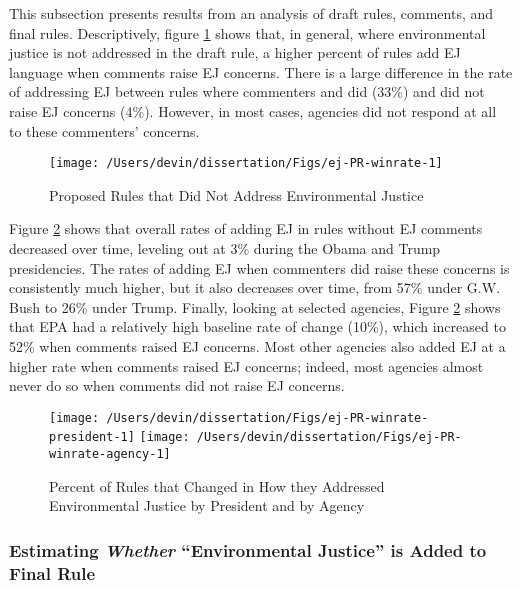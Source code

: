 \documentclass[
      12pt,
        ]{article}
\begin{document}
This subsection presents results from an analysis of draft
rules, comments, and final rules. Descriptively, figure
\ref{fig:ej-PR-winrate-1}
shows that, in general, where environmental
justice is not addressed in the draft rule, a higher percent of rules add EJ language when comments raise EJ concerns. There is a large difference in the rate of addressing EJ between rules where commenters and did (33\%) and did not raise EJ concerns (4\%). However, in most cases, agencies did not respond at all to these commenters' concerns.

\begin{figure}

{\centering \texttt{[image: /Users/devin/dissertation/Figs/ej-PR-winrate-1]} 

}

\caption{Proposed Rules that Did Not Address Environmental Justice}\label{fig:ej-PR-winrate-1}
\end{figure}

Figure \ref{fig:ej-PR-winrate-2} shows that overall rates of adding EJ in rules without EJ comments decreased over time, leveling out at 3\% during the Obama and Trump presidencies. The rates of adding EJ when commenters did raise these concerns is consistently much higher, but it also decreases over time, from 57\% under G.W. Bush to 26\% under Trump.
Finally, looking at selected agencies, Figure \ref{fig:ej-PR-winrate-2} shows that EPA had a relatively high baseline rate of change (10\%), which increased to 52\% when comments raised EJ concerns. Most other agencies also added EJ at a higher rate when comments raised EJ concerns; indeed, most agencies almost never do so when comments did not raise EJ concerns.

\begin{figure}

{\centering \texttt{[image: /Users/devin/dissertation/Figs/ej-PR-winrate-president-1]} \texttt{[image: /Users/devin/dissertation/Figs/ej-PR-winrate-agency-1]} 

}

\caption{Percent of Rules that Changed in How they Addressed Environmental Justice by President and by Agency}\label{fig:ej-PR-winrate-2}
\end{figure}

\hypertarget{estimating-whether-environmental-justice-is-added-to-final-rule}{%
\subsubsection{\texorpdfstring{Estimating \emph{Whether} ``Environmental Justice'' is Added to Final Rule}{Estimating Whether ``Environmental Justice'' is Added to Final Rule}}\label{estimating-whether-environmental-justice-is-added-to-final-rule}}
\end{document}
